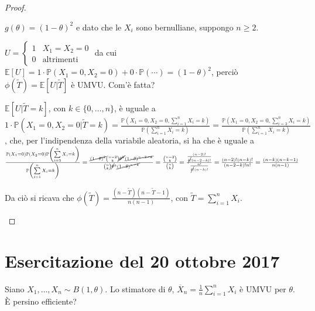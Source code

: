 \documentclass[hidelinks, 10pt]{report}
\begin{document}
\begin{proof}
\begin{enumerate}
$ g(\theta) = (1 - \theta)^{2} $ e dato che le $ X_{i} $ sono bernulliane, suppongo $ n \ge 2 $.

$ U = \begin{cases} 1 & X_{1} = X_{2} = 0 \\ 0 & \text{altrimenti} \end{cases} $ da cui $ \mathbb{E} [U] = 1 \cdot \mathbb{P} (X_{1} = 0, X_{2} = 0) + 0 \cdot \mathbb{P} (\cdots) = (1 - \theta)^{2} $, perci\`o $ \phi (\tilde{T}) = \mathbb{E} [U \vert \tilde{T}] $ \`e UMVU. Com'\`e fatta?

$ \mathbb{E} [U \vert \tilde{T} = k] $, con $ k \in \{ 0, \dotsc, n \} $, \`e uguale a $ 1 \cdot \mathbb{P} (X_{1} = 0, X_{2} = 0 \vert \tilde{T} = k) = \frac{\mathbb{P} \left( X_{1} = 0, X_{2} = 0, \sum\limits_{i = 1}^{n} X_{i} = k \right)}{\mathbb{P} \left( \sum\limits_{i = 1}^{n} X_{i} = k \right)} = \frac{\mathbb{P} \left( X_{1} = 0, X_{2} = 0, \sum\limits_{i = 3}^{n} X_{i} = k \right)}{\mathbb{P} \left( \sum\limits_{i = 1}^{n} X_{i} = k \right)} $, che, per l'indipendenza della variabile aleatoria, si ha che \`e uguale a $ \frac{\mathbb{P} (X_{1} = 0) \mathbb{P} (X_{2} = 0) \mathbb{P} \left( \sum\limits_{i = 3}^{n} X_{i} = k \right)}{\mathbb{P} \left( \sum\limits_{i = 1}^{n} X_{i} = k \right)} = \frac{\cancel{(1 - \theta)^{2}} \binom{n - 2}{k} \cancel{\theta^{k}} \cancel{(1 - \theta)^{n - 2 - k}}}{\binom{n}{k} \cancel{\theta}^{k} \cancel{(1 - \theta)^{n - k}}} = \frac{\binom{n - 2}{k}}{\binom{n}{k}} = \frac{\frac{(n - 2)!}{\cancel{k!} (n - 2 - k)!}}{\frac{n!}{\cancel{k!} (n - k)!}} = \frac{(n - 2)! (n - k)!}{(n - 2 - k)! n!} = \frac{(n - k)(n - k - 1)}{n (n - 1)} $

Da ci\`o si ricava che $ \phi (\tilde{T}) = \frac{(n - \tilde{T})(n - \tilde{T} - 1)}{n (n - 1)} $, con $ \tilde{T} = \sum\limits_{i = 1}^{n} X_{i} $.
\end{enumerate}
\end{proof}

\section{Esercitazione del 20 ottobre 2017}
\begin{ex}
Siano $ X_{1}, \dotsc, X_{n} \sim B(1, \theta) $. Lo stimatore di $ \theta $, $ \overline{X}_{n} = \frac{1}{n} \sum\limits_{i = 1}^{n} X_{i} $ \`e UMVU per $ \theta $. \`E persino efficiente? 
\end{ex}
\end{document}
